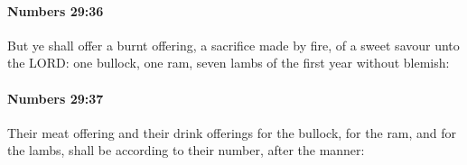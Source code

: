 		\paragraph{Numbers 29:36} %
			\label{NUMBERS-29-36}

			But ye shall offer a burnt offering, a sacrifice made by fire, of a sweet savour unto the LORD: one bullock, one ram, seven lambs of the first year without blemish:


		\paragraph{Numbers 29:37} %
			\label{NUMBERS-29-37}

			Their meat offering and their drink offerings for the bullock, for the ram, and for the lambs, shall be according to their number, after the manner:


